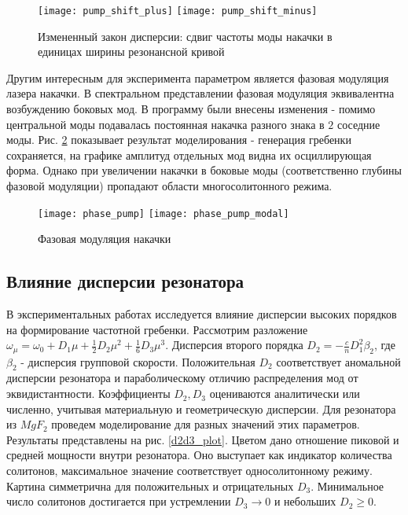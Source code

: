 \begin{figure}
  \centering
  \texttt{[image: pump\_shift\_plus]}
  \texttt{[image: pump\_shift\_minus]}
  \caption{Измененный закон дисперсии: сдвиг частоты моды накачки в единицах ширины резонансной кривой} \label{pump_shift}
\end{figure}

Другим интересным для эксперимента параметром является фазовая модуляция лазера накачки. В спектральном представлении фазовая модуляция эквивалентна возбуждению боковых мод. В программу были внесены изменения -  помимо центральной моды подавалась постоянная накачка разного знака в $2$ соседние моды. Рис. \ref{phase_pump} показывает результат моделирования - генерация гребенки сохраняется, на графике амплитуд отдельных мод видна их осциллирующая форма. Однако при увеличении накачки в боковые моды (соответственно глубины фазовой модуляции) пропадают области многосолитонного режима.

\begin{figure}
  \texttt{[image: phase\_pump]}
  \texttt{[image: phase\_pump\_modal]}
  \caption{Фазовая модуляция накачки} \label{phase_pump}
\end{figure}

\subsection{Влияние дисперсии резонатора}

В экспериментальных работах исследуется влияние дисперсии высоких порядков на формирование частотной гребенки. Рассмотрим разложение $\omega_\mu=\omega_0+D_1\mu+\frac{1}{2}D_2\mu^2+\frac{1}{6}D_3\mu^3$. Дисперсия второго порядка $D_2=-\frac{c}{n}D_1^2\beta_2$, где $\beta_2$ - дисперсия групповой скорости. Положительная $D_2$ соответствует аномальной дисперсии резонатора и параболическому отличию распределения мод от эквидистантности. Коэффициенты $D_2, D_3$ оцениваются аналитически или численно, учитывая материальную и геометрическую дисперсии. Для резонатора из $MgF_2$ проведем моделирование для разных значений этих параметров. Результаты представлены на рис. \ref{d2d3_plot}. Цветом дано отношение пиковой и средней мощности внутри резонатора. Оно выступает как индикатор количества солитонов, максимальное значение соответствует односолитонному режиму. Картина симметрична для положительных и отрицательных $D_3$. Минимальное число солитонов достигается при устремлении $D_3\rightarrow 0$ и небольших $D_2\ge0$.

